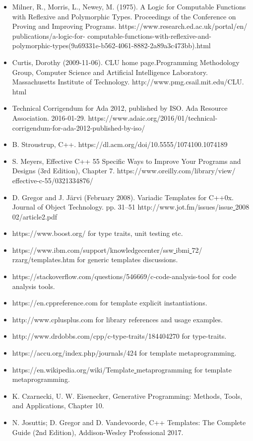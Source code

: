 \begin{itemize}
	\item Milner, R., Morris, L., Newey, M. (1975). A Logic for Computable Functions with Reflexive and Polymorphic Types. Proceedings of the Conference on Proving and Improving Programs.	https:/​/​www.​research.​ed.​ac.​uk/​portal/​en/​publications/​a-​logic-​for-	computable-​functions-​with-​reflexive-​and-​polymorphic-​types(9a69331e-b562-​4061-​8882-​2a89a3c473bb).​html
	\item Curtis, Dorothy (2009-11-06). CLU home page.Programming Methodology Group, Computer Science and Artificial Intelligence Laboratory. Massachusetts Institute	of Technology.	http:/​/​www.​pmg.​csail.​mit.​edu/​CLU.​html
	\item Technical Corrigendum for Ada 2012, published by ISO. Ada Resource Association. 2016-01-29.	https://www.adaic.org/2016/01/technical-corrigendum-for-ada-2012-published-by-iso/
	\item B. Stroustrup, C++. https:/​/​dl.​acm.​org/​doi/​10.​5555/​1074100.​1074189
	\item S. Meyers, Effective C++ 55 Specific Ways to Improve Your Programs and Designs (3rd Edition), Chapter 7.	https:/​/​www.​oreilly.​com/​library/​view/​effective-​c-​55/​0321334876/​
	\item D. Gregor and J. Järvi (February 2008). Variadic Templates for C++0x. Journal of Object Technology. pp. 31–51	http:/​/​www.​jot.​fm/​issues/​issue\underline{ }​2008\underline{ }​02/​article2.​pdf
	\item https:/​/​www.​boost.​org/​ for type traits, unit testing etc.
	\item https:/​/​www.​ibm.​com/​support/​knowledgecenter/​ssw\underline{ }​ibm\underline{ }​i\underline{ }​72/​rzarg/templates.​htm for generic templates discussions.
	\item https:/​/​stackoverflow.​com/​questions/​546669/​c-​code-​analysis-​tool for code analysis tools.
	\item https:/​/​en.​cppreference.​com for template explicit instantiations.
	\item http:/​/​www.​cplusplus.​com for library references and usage examples.
	\item http:/​/​www.​drdobbs.​com/​cpp/​c-​type-​traits/​184404270 for type-traits.
	\item https:/​/​accu.​org/​index.​php/​journals/​424 for template metaprogramming.
	\item https:/​/​en.​wikipedia.​org/​wiki/​Template\underline{ }​metaprogramming for template metaprogramming.
	\item K. Czarnecki, U. W. Eisenecker, Generative Programming: Methods, Tools, and	Applications, Chapter 10.
	\item N. Josuttis; D. Gregor and D. Vandevoorde, C++ Templates: The Complete Guide (2nd Edition), Addison-Wesley Professional 2017.
\end{itemize}

\newpage